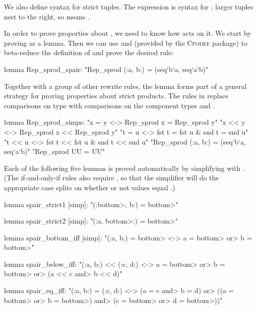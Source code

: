 \noindent
We also define syntax for strict tuples. The expression  is syntax for ; larger tuples nest to the right, so  means .
 
In order to prove properties about , we need to know how  acts on it. We start by proving  as a lemma. Then we can use  and  (provided by the \textsc{Cpodef} package) to beta-reduce the definition of  and prove the desired rule:

\begin{isacode}
lemma Rep_sprod_spair: "Rep_sprod (:a, b:) = (seq`b`a, seq`a`b)"
\end{isacode}

\noindent
Together with a group of other rewrite rules, the lemma  forms part of a general strategy for proving properties about strict products. The rules in  replace comparisons on type  with comparisons on the component types  and .

\begin{isacode}
lemma Rep_sprod_simps:
  "x = y <-> Rep_sprod x = Rep_sprod y"
  "x << y <-> Rep_sprod x << Rep_sprod y"
  "t = u <-> fst t = fst u & snd t = snd u"
  "t << u <-> fst t << fst u & snd t << snd u"
  "Rep_sprod (:a, b:) = (seq`b`a, seq`a`b)"
  "Rep_sprod UU = UU"
\end{isacode}

\noindent
Each of the following five lemmas is proved automatically by simplifying with . (The if-and-only-if rules also require , so that the simplifier will do the appropriate case splits on whether or not values equal .)

\begin{isacode}
lemma spair_strict1 [simp]: "(:\<bottom>, b:) = \<bottom>"
\end{isacode}
\unmedskip
{}
\begin{isacode}
lemma spair_strict2 [simp]: "(:a, \<bottom>:) = \<bottom>"
\end{isacode}
\unmedskip
{}
\begin{isacode}
lemma spair_bottom_iff [simp]: "(:a, b:) = \<bottom> <-> a = \<bottom> \<or> b = \<bottom>"
\end{isacode}
\unmedskip
{}
\begin{isacode}
lemma spair_below_iff: "(:a, b:) << (:c, d:) <->
  a = \<bottom> \<or> b = \<bottom> \<or> (a << c \<and> b << d)"
\end{isacode}
\unmedskip
{}
\begin{isacode}
lemma spair_eq_iff: "(:a, b:) = (:c, d:) <->
  (a = c \<and> b = d) \<or> ((a = \<bottom> \<or> b = \<bottom>) \<and> (c = \<bottom> \<or> d = \<bottom>))"
\end{isacode}


